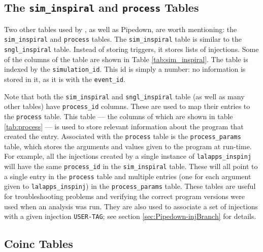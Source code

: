 \subsection{The \texttt{sim\_inspiral} and \texttt{process} Tables}
\label{sec:sim_inspiral-process_tables}

Two other tables used by \hipe, as well as Pipedown, are worth mentioning: the
\texttt{sim\_inspiral} and \texttt{process} tables. The \texttt{sim\_inspiral}
table is similar to the \\
\texttt{sngl\_inspiral} table. Instead of storing
triggers, it stores lists of injections. Some of the columns of the table are
shown in Table \ref{tab:sim_inspiral}. The table is indexed by the
\texttt{simulation\_id}. This id is simply a number: no information is stored
in it, as it is with the \texttt{event\_id}.

Note that both the \texttt{sim\_inspiral} and \texttt{sngl\_inspiral} table (as
well as many other tables) have \texttt{process\_id} columns. These are used to
map their entries to the \texttt{process} table. This table --- the columns of
which are shown in table \ref{tab:process} --- is used to store relevant
information about the program that created the entry. Associated with the
\texttt{process} table is the \texttt{process\_params} table, which stores the
arguments and values given to the program at run-time. For example, all the
injections created by a single instance of \texttt{lalapps\_inspinj} will have
the same \texttt{process\_id} in the \texttt{sim\_inspiral} table. These will
all point to a single entry in the \texttt{process} table and multiple entries
(one for each argument given to \texttt{lalapps\_inspinj}) in the
\texttt{process\_params} table. These tables are useful for troubleshooting
problems and verifying the correct program versions were used when an analysis
was run. They are also used to associate a set of injections with a given
injection \texttt{USER-TAG}; see section \ref{sec:Pipedown-injBranch} for details.

\subsection{Coinc Tables}
\label{sec:coinc_tables}

